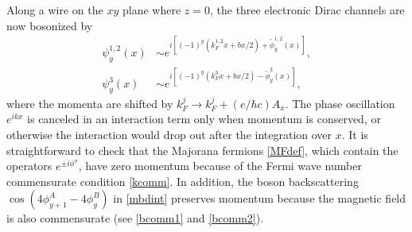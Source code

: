 Along a wire on the $xy$ plane where $z=0$, the three electronic Dirac channels are now bosonized by \begin{align}\psi_y^{1,2}(x)&\sim e^{i[(-1)^y(k_F^{1,2}x+bx/2)+\tilde\phi_y^{1,2}(x)]},\\\psi_y^3(x)&\sim e^{i[(-1)^y(k_F^3x+bx/2)-\tilde\phi_y^3(x)]},\nonumber\end{align} where the momenta are shifted by $k_F^j\to k_F^j+(e/\hbar c)A_x$. The phase oscillation $e^{ikx}$ is canceled in an interaction term only when momentum is conserved, or otherwise the interaction would drop out after the integration over $x$. It is straightforward to check that the Majorana fermions \eqref{MFdef}, which contain the operators $e^{\pm i\phi^\sigma}$, have zero momentum because of the Fermi wave number commensurate condition \eqref{kcomm}. In addition, the boson backscattering $\cos(4\phi^A_{y+1}-4\phi^B_y)$ in \eqref{mbdint} preserves momentum because the magnetic field is also commensurate (see \eqref{bcomm1} and \eqref{bcomm2}).

